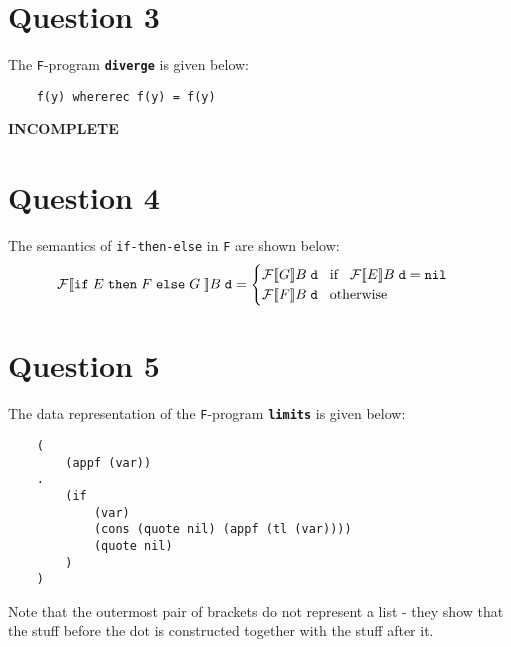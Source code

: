 \documentclass{article}
\begin{document}
\section*{Question 3}
The \texttt{F}-program \textbf{\texttt{diverge}} is given below:
\begin{verbatim}
    f(y) whererec f(y) = f(y)
\end{verbatim}
\textbf{INCOMPLETE}

\section*{Question 4}
The semantics of \texttt{if-then-else} in \texttt{F} are shown below:
\begin{equation*}
    \mathcal{F} [\![ \texttt{if} \hspace{1mm} E \hspace{1mm} \texttt{then} \hspace{1mm} F \hspace{1mm} \texttt{else} \hspace{1mm} G \hspace{1mm} ]\!] B \hspace{1mm} \texttt{d} = \begin{cases}
        \mathcal{F} [\![ G ]\!] B \hspace{1mm} \texttt{d} \hspace{3mm} \text{if} \hspace{3mm} \mathcal{F} [\![ E ]\!] B \hspace{1mm} \texttt{d} = \texttt{nil} \\
        \mathcal{F} [\![ F ]\!] B \hspace{1mm} \texttt{d} \hspace{3mm} \text{otherwise}
    \end{cases}
\end{equation*}

\section*{Question 5}
The data representation of the \texttt{F}-program \textbf{\texttt{limits}} is given below:
\begin{verbatim}
    (
        (appf (var))
    .
        (if
            (var)
            (cons (quote nil) (appf (tl (var))))
            (quote nil)
        )
    )
\end{verbatim}
Note that the outermost pair of brackets do not represent a list - they show that the stuff before the dot is constructed together with the stuff after it.
\end{document}
